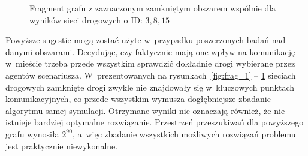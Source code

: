 \documentclass[twoside,12pt]{report}
\begin{document}
\begin{figure}[htbp]
\centering
{}
\caption{Fragment grafu z zaznaczonym zamkniętym obszarem wspólnie dla wyników sieci drogowych o ID: $3, 8, 15$}
\label{fig:frag_4}
\end{figure}

Powyższe sugestie mogą zostać użyte w~przypadku poszerzonych badań nad danymi obszarami. Decydując, czy faktycznie mają one wpływ na komunikację w~mieście trzeba przede wszystkim sprawdzić dokładnie drogi wybierane przez agentów scenariusza. W~prezentowanych na rysunkach~\ref{fig:frag_1} -- \ref{fig:frag_4} sieciach drogowych zamknięte drogi zwykle nie znajdowały się w~kluczowych punktach komunikacyjnych, co przede wszystkim wymusza dogłębniejsze zbadanie algorytmu samej symulacji. Otrzymane wyniki nie oznaczają również, że nie istnieje bardziej optymalne rozwiązanie. Przestrzeń przeszukiwań dla powyższego grafu wynosiła $2^{90}$, a~więc zbadanie wszystkich możliwych rozwiązań problemu jest praktycznie niewykonalne.
\end{document}

